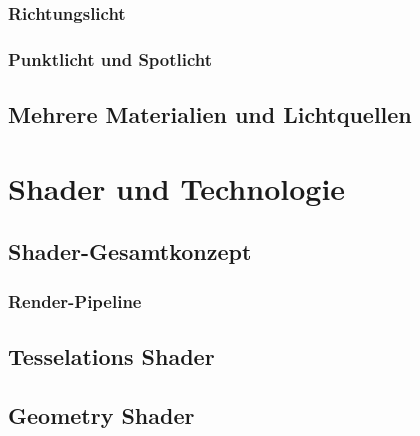 \documentclass{scrreprt}
\begin{document}
\subsection{Richtungslicht}
\subsection{Punktlicht und Spotlicht}

\section{Mehrere Materialien und Lichtquellen}


\chapter{Shader und Technologie}

\section{Shader-Gesamtkonzept}
\subsection{Render-Pipeline}

\section{Tesselations Shader}

\section{Geometry Shader}
\end{document}

